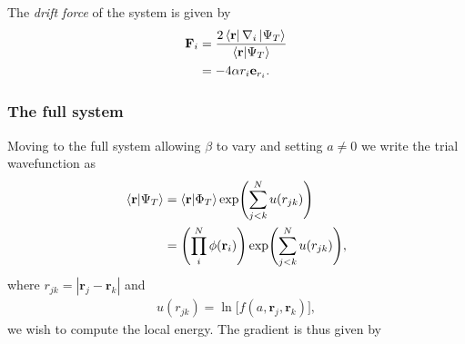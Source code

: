 \documentclass[
    a4paper, aps, twocolumn, floatfix, superscriptaddress]{revtex4-1}
\newcommand{\vf}{\mathbf}
\newcommand{\1}{\mathds{1}}
\begin{document}
            The \textit{drift force} of the system is given by
            \begin{align}
                \vf{F}_i
                &=
                \frac{2\bra{\vf{r}}\nabla_i\ket{\Psi_T}}
                {\bra{\vf{r}}\ket{\Psi_T}} \\
                &= -4\alpha r_i\vf{e}_{{r_i}}.
            \end{align}

        \subsubsection{The full system}
            Moving to the full system allowing $\beta$ to vary and setting $a
            \neq 0$ we write the trial wavefunction as
            \begin{align}
                \bra{\vf{r}}\ket{\Psi_T}
                &=
                \bra{\vf{r}}\ket{\Phi_T}
                \exp\Biggl(
                    \sum_{j < k}^N u(r_{jk})
                \Biggr) \\
                &=
                \Biggl(
                    \prod_i^N \phi(\vf{r}_i)
                \Biggr)
                \exp\Biggl(
                    \sum_{j < k}^N u(r_{jk})
                \Biggr),
            \end{align}
            where $r_{jk} = |\vf{r}_j - \vf{r}_k|$ and
            \begin{align}
                u(r_{jk}) = \ln\bigl[f(a, \vf{r}_j, \vf{r}_k)\bigr],
            \end{align}
            we wish to compute the local energy. The gradient is thus given by
\end{document}
